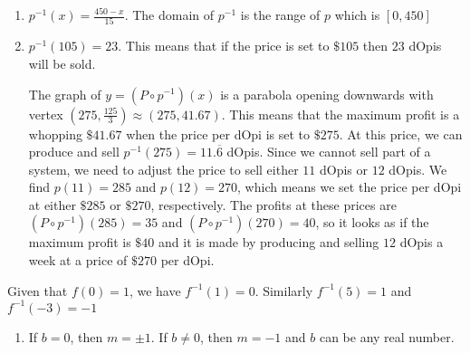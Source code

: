 \begin{exenum}
\item  

\begin{enumerate}

\item $p^{-1}(x) = \frac{450-x}{15}$.  The domain of $p^{-1}$ is the range of $p$ which is $[0,450]$

\item  $p^{-1}(105) = 23$. This means that if the price is set to $\$105$ then $23$ dOpis will be sold.


The graph of $y = \left(P\circ p^{-1}\right)(x)$ is a parabola opening downwards with vertex $\left(275, \frac{125}{3}\right) \approx (275, 41.67)$.  This means that the maximum profit is a whopping $\$41.67$ when the price per dOpi is set to $\$275$.   At this price, we can produce and sell $p^{-1}(275) = 11.\overline{6}$ dOpis.  Since we cannot sell part of a system, we need to adjust the price to sell either $11$ dOpis or $12$ dOpis. We find $p(11) = 285$ and $p(12) = 270$, which means we set the price per dOpi at either $\$285$ or $\$270$, respectively.  The profits at these prices are $\left(P\circ p^{-1}\right)(285) = 35$ and  $\left(P\circ p^{-1}\right)(270) = 40$, so it looks as if the maximum profit is $\$40$ and it is made by producing and selling $12$ dOpis a week at a price of $\$270$ per dOpi.

\end{enumerate}

\addtocounter{enumi}{1}

\item Given that $f(0) = 1$, we have $f^{-1}(1) = 0$.  Similarly $f^{-1}(5) = 1$ and $f^{-1}(-3) = -1$

\addtocounter{enumi}{9}

\item  \begin{enumerate} \addtocounter{enumii}{1} \item If $b =0$, then $m = \pm 1$.  If $b \neq 0$, then $m = -1$ and $b$ can be any real number. \end{enumerate}

\end{exenum}

